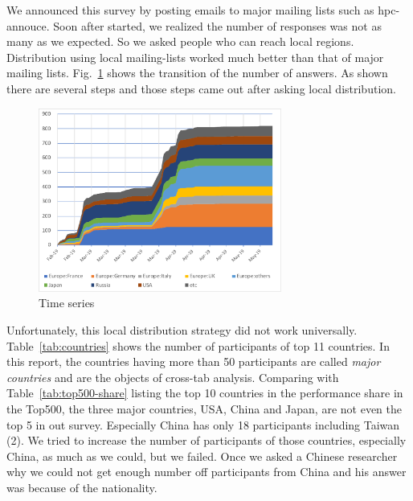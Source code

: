 \documentclass[conference,10pt,letterpaper]{IEEEtran}
\begin{document}
%
%
We announced this survey by posting emails to major mailing lists such
as hpc-annouce. Soon after started, we realized the number of
responses was not as many as we expected. So we asked people who can
reach local regions. Distribution using local mailing-lists worked
much better than that of major mailing
lists. Fig.~\ref{fig:time-series} shows the transition of the number
of answers. As shown there are several steps and those steps came out
after asking local distribution. 
%
\begin{figure}[htb]
\begin{center}
\includegraphics[width=8cm]{Figs/TimeSeries-Zoom.pdf}
\caption{Time series}
\label{fig:time-series}
\end{center}
\end{figure}
%
Unfortunately, this local distribution strategy did not work
universally. Table~\ref{tab:countries} shows the number
of participants of top 11 countries. In this report, the
countries having more than 50 participants are called {\it major
  countries} and are the objects of cross-tab analysis. 
Comparing with Table~\ref{tab:top500-share} listing the top 10
countries in the performance share in the Top500\cite{Top500}, the
three major countries, USA, China and Japan, are not even the top 5 in
out survey. Especially China has only 18 participants including
Taiwan (2). We tried to increase the number of participants of those
countries, especially China, as much as we could, but we failed. Once
we asked a Chinese researcher why we could not get enough number off
participants from China and his answer was because of the nationality. 
%
\end{document}
